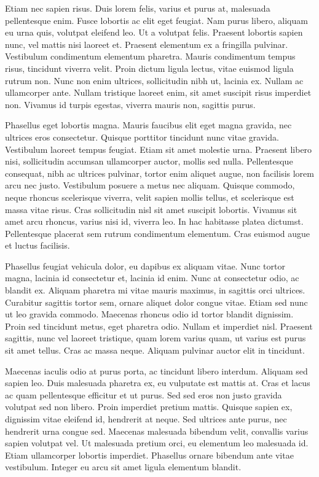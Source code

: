 \documentclass{modelica}
\begin{document}
Etiam nec sapien risus. Duis lorem felis, varius et purus at, malesuada pellentesque enim. Fusce lobortis ac elit eget feugiat. Nam purus libero, aliquam eu urna quis, volutpat eleifend leo. Ut a volutpat felis. Praesent lobortis sapien nunc, vel mattis nisi laoreet et. Praesent elementum ex a fringilla pulvinar. Vestibulum condimentum elementum pharetra. Mauris condimentum tempus risus, tincidunt viverra velit. Proin dictum ligula lectus, vitae euismod ligula rutrum non. Nunc non enim ultrices, sollicitudin nibh ut, lacinia ex. Nullam ac ullamcorper ante. Nullam tristique laoreet enim, sit amet suscipit risus imperdiet non. Vivamus id turpis egestas, viverra mauris non, sagittis purus.

Phasellus eget lobortis magna. Mauris faucibus elit eget magna gravida, nec ultrices eros consectetur. Quisque porttitor tincidunt nunc vitae gravida. Vestibulum laoreet tempus feugiat. Etiam sit amet molestie urna. Praesent libero nisi, sollicitudin accumsan ullamcorper auctor, mollis sed nulla. Pellentesque consequat, nibh ac ultrices pulvinar, tortor enim aliquet augue, non facilisis lorem arcu nec justo. Vestibulum posuere a metus nec aliquam. Quisque commodo, neque rhoncus scelerisque viverra, velit sapien mollis tellus, et scelerisque est massa vitae risus. Cras sollicitudin nisl sit amet suscipit lobortis. Vivamus sit amet arcu rhoncus, varius nisi id, viverra leo. In hac habitasse platea dictumst. Pellentesque placerat sem rutrum condimentum elementum. Cras euismod augue et luctus facilisis.

Phasellus feugiat vehicula dolor, eu dapibus ex aliquam vitae. Nunc tortor magna, lacinia id consectetur et, lacinia id enim. Nunc at consectetur odio, ac blandit ex. Aliquam pharetra mi vitae mauris maximus, in sagittis orci ultrices. Curabitur sagittis tortor sem, ornare aliquet dolor congue vitae. Etiam sed nunc ut leo gravida commodo. Maecenas rhoncus odio id tortor blandit dignissim. Proin sed tincidunt metus, eget pharetra odio. Nullam et imperdiet nisl. Praesent sagittis, nunc vel laoreet tristique, quam lorem varius quam, ut varius est purus sit amet tellus. Cras ac massa neque. Aliquam pulvinar auctor elit in tincidunt.

Maecenas iaculis odio at purus porta, ac tincidunt libero interdum. Aliquam sed sapien leo. Duis malesuada pharetra ex, eu vulputate est mattis at. Cras et lacus ac quam pellentesque efficitur et ut purus. Sed sed eros non justo gravida volutpat sed non libero. Proin imperdiet pretium mattis. Quisque sapien ex, dignissim vitae eleifend id, hendrerit at neque. Sed ultrices ante purus, nec hendrerit urna congue sed. Maecenas malesuada bibendum velit, convallis varius sapien volutpat vel. Ut malesuada pretium orci, eu elementum leo malesuada id. Etiam ullamcorper lobortis imperdiet. Phasellus ornare bibendum ante vitae vestibulum. Integer eu arcu sit amet ligula elementum blandit.
\end{document}
